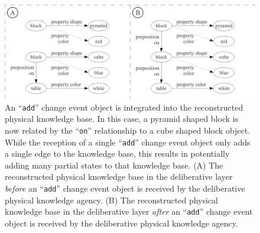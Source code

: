 \begin{figure}
\centering
\includegraphics[width=12cm]{gfx/relationship_partial_state_abstraction_add}
\caption[An ``{\tt{add}}'' change event object is integrated into the
  reconstructed physical knowledge base.]{An ``{\tt{add}}'' change
  event object is integrated into the reconstructed physical knowledge
  base.  In this case, a pyramid shaped block is now related by the
  ``{\tt{on}}'' relationship to a cube shaped block object.  While the
  reception of a single ``{\tt{add}}'' change event object only adds a
  single edge to the knowledge base, this results in potentially
  adding many partial states to that knowledge base.  (A) The
  reconstructed physical knowledge base in the deliberative layer
  \emph{before} an ``{\tt{add}}'' change event object is received by
  the deliberative physical knowledge agency.  (B) The reconstructed
  physical knowledge base in the deliberative layer \emph{after} an
  ``{\tt{add}}'' change event object is received by the deliberative
  physical knowledge agency.}
\label{figure:relationship_partial_state_abstraction_add}
\end{figure}

